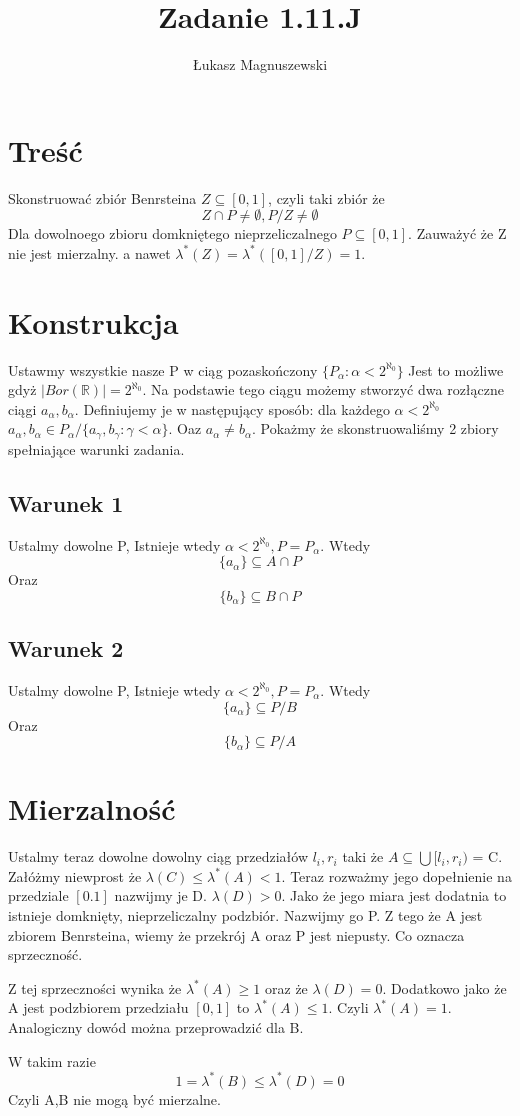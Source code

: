 \documentclass{article}
\title{Zadanie 1.11.J}
\author{Łukasz Magnuszewski}
\date{\vspace{-5ex}}
\begin{document}
\maketitle
\section*{Treść}
Skonstruować zbiór Benrsteina $Z \subseteq [0,1]$, czyli taki zbiór że \[Z \cap P \neq \emptyset, P / Z \neq \emptyset\]
Dla dowolnoego zbioru domkniętego nieprzeliczalnego $P \subseteq [0,1]$. Zauważyć że Z nie jest mierzalny. a nawet $\lambda^{*}(Z) = \lambda^{*}([0,1] / Z) = 1$.


\section*{Konstrukcja}

Ustawmy wszystkie nasze P w ciąg pozaskończony $ \{ P_{\alpha} : \alpha < 2^{\aleph_0} \}$ Jest to możliwe gdyż $|Bor(\mathbb{R})| = 2^{\aleph_0}$. Na podstawie tego ciągu możemy stworzyć dwa rozłączne ciągi $a_{\alpha}, b_{\alpha}$. Definiujemy je w następujący sposób: dla każdego $\alpha < 2^{\aleph_0}$
$a_{\alpha}, b_{\alpha} \in P_{\alpha} / \{a_{\gamma}, b_{\gamma} : \gamma < \alpha \} $. Oaz $a_{\alpha} \neq b_{\alpha}$. Pokażmy że skonstruowaliśmy 2 zbiory spełniające warunki zadania. 
\subsection*{Warunek 1}
Ustalmy dowolne P, Istnieje wtedy $\alpha < 2^{\aleph_0}, P = P_\alpha$. Wtedy 
\[ \{ a_{\alpha} \} \subseteq  A \cap P \]
Oraz
\[ \{ b_{\alpha} \} \subseteq  B \cap P \]
\subsection*{Warunek 2}
Ustalmy dowolne P, Istnieje wtedy $\alpha < 2^{\aleph_0}, P = P_\alpha$. Wtedy 
\[ \{ a_{\alpha} \} \subseteq  P / B \]
Oraz
\[ \{ b_{\alpha} \} \subseteq  P / A \]

\section*{Mierzalność}


Ustalmy teraz dowolne dowolny ciąg przedziałów $l_i, r_i$ taki że $A \subseteq \bigcup [l_i, r_i)$ = C.
Załóżmy niewprost że $\lambda(C) \leq \lambda^*(A) < 1$.
Teraz rozważmy jego dopełnienie na przedziale $[0.1]$ nazwijmy je D. $\lambda(D) > 0$. Jako że jego miara jest dodatnia to istnieje domknięty, nieprzeliczalny podzbiór. Nazwijmy go P. Z tego że A jest zbiorem Benrsteina, wiemy że przekrój A oraz P jest niepusty. Co oznacza sprzeczność. 


Z tej sprzeczności wynika że $\lambda^*(A) \geq 1$ oraz że $\lambda(D) = 0$.  Dodatkowo jako że A jest podzbiorem przedziału $[0,1]$ to $\lambda^*(A) \leq 1$. Czyli $\lambda^*(A) = 1$. Analogiczny dowód można przeprowadzić dla B.


W takim razie 
\[
  1 = \lambda^{*}(B) \leq  \lambda^{*}(D) = 0  
\]
Czyli A,B nie mogą być mierzalne.
\end{document}
